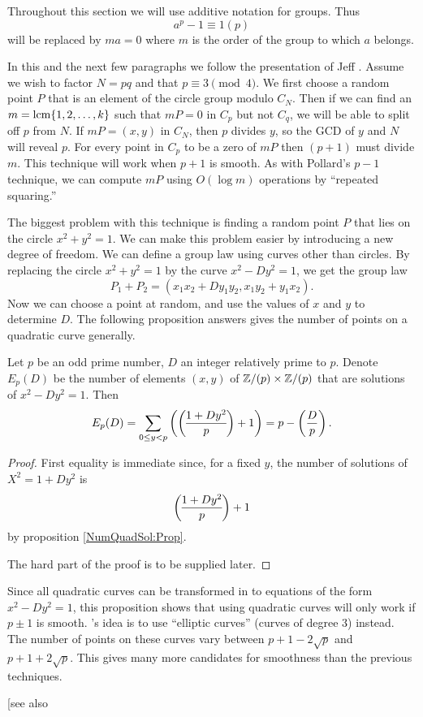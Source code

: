Throughout this section we will use additive notation for groups.
Thus 
\[
a^p - 1\equiv 1 (p)
\]
will be replaced by $ma = 0$ where $m$ is the order of the group to which
$a$ belongs.

In this and the next few paragraphs we follow the presentation of Jeff
{\Shallit}.  Assume we wish to factor $N = pq$ and that $p\equiv 3 \pmod4$.
We first choose a random point $P$ that is an element of the circle
group modulo $C_N$.  Then if we can find an $m = \mathop{\rm lcm}\nolimits\{1, 2, \ldots,
k\}$ such that $mP = 0$ in $C_p$ but not $C_q$, we will be able to split
off $p$ from $N$.  If $mP = (x, y)$ in $C_N$, then $p$ divides $y$, so
the GCD of $y$ and $N$ will reveal $p$.  For every point in $C_p$ to be
a zero of $mP$ then $(p + 1)$ must divide $m$.  This technique will work
when $p + 1$ is smooth.  As with Pollard's $p-1$ technique, we can
compute $mP$ using $O(\log m)$ operations by ``repeated squaring.''

The biggest problem with this technique is finding a random point $P$
that lies on the circle $x^2+y^2=1$.  We can make this problem easier by
introducing a new degree of freedom.  We can define a group law using
curves other than circles.  By replacing the circle $x^2+y^2=1$ by the
curve $x^2 - D y^2 = 1$, we get the group law
\[
P_1 + P_2 = (x_1 x_2 + D y_1 y_2, x_1 y_2 + y_1 x_2).
\]
Now we can choose a point at random, and use the values of $x$ and $y$
to determine $D$.  The following proposition answers gives the number of
points on a quadratic curve generally.

\begin{proposition}
Let $p$ be an odd prime number, $D$ an integer relatively prime to
$p$.  Denote $E_p(D)$ be the number of elements $(x, y)$ of $\mathbb{Z}/(p)
\times \mathbb{Z}/(p)$ that are solutions of $x^2 - D y^2 = 1$.  Then
\[
E_p(D) = 
\sum_{0\le y < p} \left({1 + D y^2 \legendre p} + 1\right)
= p - \left(\frac{D}{p}\right).
\]
\end{proposition}

\begin{proof}
First equality is immediate since, for a fixed $y$, the number of solutions
of $X^2 = 1 +Dy^2$ is 
\[
{1 + D y^2 \legendre p} + 1
\]
by proposition \ref{NumQuadSol:Prop}.

The hard part of the proof is to be supplied later. 
\end{proof}

Since all quadratic curves can be transformed in to equations of the
form $x^2 - D y^2 = 1$, this proposition shows that using quadratic
curves will only work if $p \pm 1$ is smooth.  {\LenstraH}'s idea is
to use ``elliptic curves'' (curves of degree 3) instead.  The number
of points on these curves vary between $p + 1 -2\sqrt{p}$ and $p + 1
+2\sqrt{p}$.  This gives many more candidates for smoothness than the
previous techniques.


[see also \cite{Adleman91,LenstraAK90}
